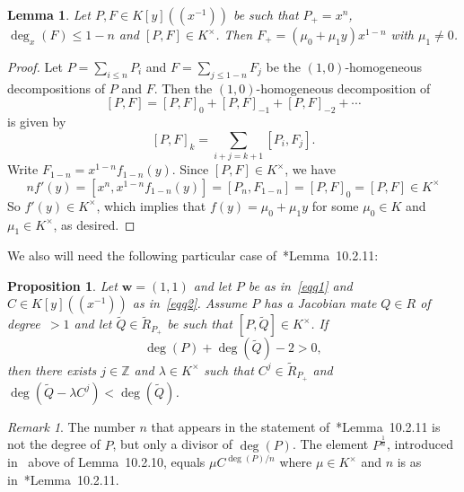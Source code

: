 \documentclass[reqno,a4paper]{amsart}
\newtheorem{lemma}[theorem]{Lemma}
\newtheorem{proposition}[theorem]{Proposition}
\theoremstyle{definition}
\theoremstyle{remark}
\newtheorem{remark}[theorem]{Remark}
\begin{document}
\begin{lemma}\label{auxiliar} Let $P,F\in K[y]((x^{-1}))$ be such that $P_+ = x^n$,
$\deg_x(F)\le 1-n$ and $[P,F]\in K^{\times}$. Then $F_+=(\mu_0+\mu_1 y)x^{1-n}$ with $\mu_1\ne 0$.
\end{lemma}

\begin{proof} Let $P=\sum_{i\le n} P_{i}$ and $F=\sum_{j\le 1-n} F_{j}$ be the
$(1,0)$-homogeneous decompositions of $P$ and $F$. Then the $(1,0)$-homogeneous decomposition of
$$
[P,F] = [P,F]_0 + [P,F]_{-1} + [P,F]_{-2} +\cdots
$$
is given by
$$
[P,F]_k=\sum_{i+j=k+1} [P_i,F_j].
$$
Write $F_{1-n} = x^{1-n} f_{1-n}(y)$. Since $[P,F]\in K^{\times}$, we have
$$
nf'(y) = [x^n,x^{1-n}f_{1-n}(y)] = [P_n,F_{1-n}] = [P,F]_0 = [P,F]\in K^{\times}
$$
So $f'(y)\in K^{\times}$, which implies that $f(y)=\mu_0+\mu_1 y$ for some
$\mu_0\in K$ and $\mu_1\in K^{\times}$, as desired.
\end{proof}

We also will need the following particular case of~\cite{vdE}*{Lemma~10.2.11}:

\begin{proposition}\label{vdE 10.2.11} Let $\mathbf{w}=(1,1)$ and let $P$ be as
in~\eqref{eqq1} and $C\in K[y]((x^{-1}))$ as in~\eqref{eqq2}. Assume $P$ has a
Jacobian mate $Q\!\in\! R$ of degree~$>1$ and let $\tilde Q\!\in\!\tilde R_{P_+}$
be such that $[P,\tilde Q]\!\in\! K^{\times}$. If
$$
\deg(P)+\deg(\tilde Q)-2 > 0,
$$
then there exists $j\in\mathds{Z}$ and $\lambda\in K^{\times}$ such that
$C^j\in \tilde R_{P_+}$ and $\deg(\tilde Q-\lambda C^j)<\deg(\tilde Q)$.
\end{proposition}

\begin{remark} The number $n$ that appears in the statement
of~\cite{vdE}*{Lemma~10.2.11} is not the degree of $P$, but only a divisor of $\deg(P)$.
The element $P^{\frac{1}{n}}$, introduced in~\cite{vdE} above of Lemma~10.2.10, equals
$\mu C^{\deg(P)/n}$ where $\mu\in K^{\times}$ and $n$ is as in~\cite{vdE}*{Lemma~10.2.11}.
\end{remark}
\end{document}
